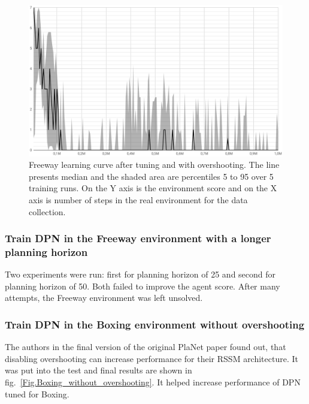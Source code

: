 \begin{figure}[H]
\includegraphics[width=1\textwidth,keepaspectratio]{figures/PlaNet/Freeway_with_overshooting.png}
\caption[Freeway learning curve after tuning and with overshooting]{Freeway learning curve after tuning and with overshooting. The line presents median and the shaded area are percentiles 5 to 95 over 5 training runs. On the Y axis is the environment score and on the X axis is number of steps in the real environment for the data collection.}
\label{Fig.Freeway_with_overshooting}
\end{figure}

\subsubsection{Train DPN in the Freeway environment with a longer planning horizon}

Two experiments were run: first for planning horizon of 25 and second for planning horizon of 50. Both failed to improve the agent score. After many attempts, the Freeway environment was left unsolved.

\subsubsection{Train DPN in the Boxing environment without overshooting}

The authors in the final version of the original PlaNet paper \cite{Algo.PlaNet} found out, that disabling overshooting can increase performance for their RSSM architecture. It was put into the test and final results are shown in fig.~\ref{Fig.Boxing_without_overshooting}. It helped increase performance of DPN tuned for Boxing.

